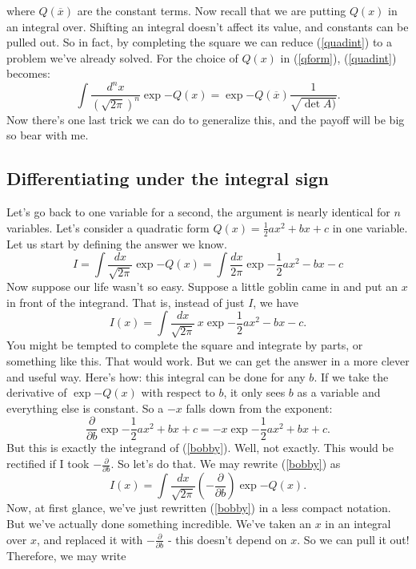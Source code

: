 \documentclass{book}
\begin{document}
where $Q(\overline{x})$ are the constant terms. Now recall that we are putting $Q(x)$ in an integral over. Shifting an integral doesn't affect its value, and constants can be pulled out. So in fact, by completing the square we can reduce (\ref{quadint}) to a problem we've already solved. For the choice of $Q(x)$ in (\ref{qform}), (\ref{quadint}) becomes:
\begin{equation} \label{cts}
\int \frac{d^n x}{(\sqrt{2\pi})^n} \exp{-Q(x)} = \exp{-Q(\overline{x})} \frac{1}{\sqrt{\det A)}}.
\end{equation}
Now there's one last trick we can do to generalize this, and the payoff will be big so bear with me. 

\newpage
\subsection{Differentiating under the integral sign}
Let's go back to one variable for a second, the argument is nearly identical for $n$ variables. Let's consider a quadratic form $Q(x) = \frac{1}{2} ax^2 + bx + c$ in one variable. Let us start by defining the answer we know.
\[
I = \int \frac{dx}{\sqrt{2\pi}} \exp{-Q(x)} = \int \frac{dx}{2\pi} \exp{-\frac{1}{2}ax^2 - bx - c}
\]
Now suppose our life wasn't so easy. Suppose a little goblin came in and put an $x$ in front of the integrand. That is, instead of just $I$, we have
\begin{equation} \label{bobby}
I (x) = \int \frac{dx}{\sqrt{2\pi}} \, x \exp{-\frac{1}{2} a x^2 - bx - c}. 
\end{equation}
You might be tempted to complete the square and integrate by parts, or something like this. That would work. But we can get the answer in a more clever and useful way. Here's how: this integral can be done for any $b$. If we take the derivative of $\exp{-Q(x)}$ with respect to $b$, it only sees $b$ as a variable and everything else is constant. So a $-x$ falls down from the exponent:
\[
\frac{\partial}{\partial b} \exp{-\frac{1}{2}ax^2 + bx + c} = - x \exp{-\frac{1}{2} ax^2 + bx + c}.
\]
But this is exactly the integrand of (\ref{bobby}). Well, not exactly. This would be rectified if I took $-\frac{\partial}{\partial b}$. So let's do that. We may rewrite (\ref{bobby}) as 
\begin{equation}
I (x) = \int \frac{dx}{\sqrt{2\pi}} \left(-\frac{\partial}{\partial b}\right) \exp{-Q(x)}.
\end{equation}
Now, at first glance, we've just rewritten (\ref{bobby}) in a less compact notation. But we've actually done something incredible. We've taken an $x$ in an integral over $x$, and replaced it with $-\frac{\partial}{\partial b}$ - this doesn't depend on $x$. So we can pull it out! Therefore, we may write
\end{document}
